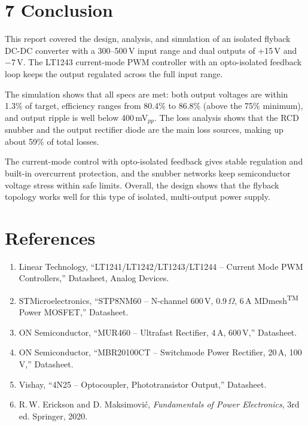 \section*{7 Conclusion}

This report covered the design, analysis, and simulation of an isolated flyback DC-DC converter with a 300--500\,V input range and dual outputs of +15\,V and $-7$\,V. The LT1243 current-mode PWM controller with an opto-isolated feedback loop keeps the output regulated across the full input range.

The simulation shows that all specs are met: both output voltages are within 1.3\% of target, efficiency ranges from 80.4\% to 86.8\% (above the 75\% minimum), and output ripple is well below 400\,mV$_{pp}$. The loss analysis shows that the RCD snubber and the output rectifier diode are the main loss sources, making up about 59\% of total losses.

The current-mode control with opto-isolated feedback gives stable regulation and built-in overcurrent protection, and the snubber networks keep semiconductor voltage stress within safe limits. Overall, the design shows that the flyback topology works well for this type of isolated, multi-output power supply.

\section*{References}
\begin{enumerate}
    \item Linear Technology, ``LT1241/LT1242/LT1243/LT1244 -- Current Mode PWM Controllers,'' Datasheet, Analog Devices.
    \item STMicroelectronics, ``STP8NM60 -- N-channel 600\,V, 0.9\,$\Omega$, 6\,A MDmesh\textsuperscript{TM} Power MOSFET,'' Datasheet.
    \item ON Semiconductor, ``MUR460 -- Ultrafast Rectifier, 4\,A, 600\,V,'' Datasheet.
    \item ON Semiconductor, ``MBR20100CT -- Switchmode Power Rectifier, 20\,A, 100\,V,'' Datasheet.
    \item Vishay, ``4N25 -- Optocoupler, Phototransistor Output,'' Datasheet.
    \item R.\,W. Erickson and D. Maksimovi\'{c}, \textit{Fundamentals of Power Electronics}, 3rd ed. Springer, 2020.
\end{enumerate}
